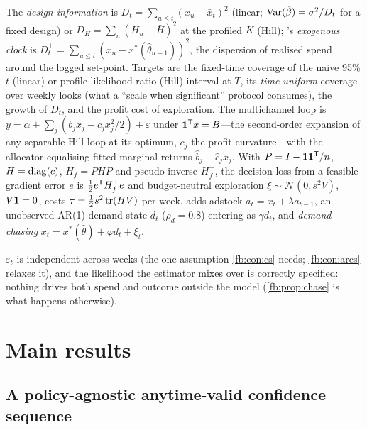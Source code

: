 \begin{definition}
\label{fb:def:clocks}
The \emph{design information} is $D_t = \sum_{u \le t}(x_u - \bar x_t)^2$ (linear; $\operatorname{Var}(\hat\beta) = \sigma^2/D_t$ for a fixed design) or $D_H = \sum_u(H_u - \bar H)^2$ at the profiled $K$ (Hill); 's \emph{exogenous clock} is $D^\perp_t = \sum_{u \le t}(x_u - x^*(\hat\theta_{u-1}))^2$, the dispersion of realised spend around the logged set-point. Targets are the fixed-time coverage of the naive 95\% $t$ (linear) or profile-likelihood-ratio (Hill) interval at $T$, its \emph{time-uniform} coverage over weekly looks (what a ``scale when significant'' protocol consumes), the growth of $D_t$, and the profit cost of exploration. The multichannel loop is $y = \alpha + \sum_j(b_jx_j - c_jx_j^2/2) + \varepsilon$ under $\mathbf{1}^{\mathsf{T}} x = B$---the second-order expansion of any separable Hill loop at its optimum, $c_j$ the profit curvature---with the allocator equalising fitted marginal returns $\hat b_j - \hat c_jx_j$. With $P = I - \mathbf{1}\mathbf{1}^{\mathsf{T}}/n$, $H = \operatorname{diag}(c)$, $H_f = PHP$ and pseudo-inverse $H_f^+$, the decision loss from a feasible-gradient error $e$ is $\tfrac12e^{\mathsf{T}} H_f^+e$ and budget-neutral exploration $\xi \sim \mathcal N(0, s^2V)$, $V\mathbf{1} = 0$, costs $\tau = \tfrac12s^2\operatorname{tr}(HV)$ per week.  adds adstock $a_t = x_t + \lambda a_{t-1}$, an unobserved AR(1) demand state $d_t$ ($\rho_d = 0.8$) entering as $\gamma d_t$, and \emph{demand chasing} $x_t = x^*(\hat\theta) + \varphi d_t + \xi_t$.
\end{definition}

\begin{assumption}
\label{fb:ass:main}
$\varepsilon_t$ is independent across weeks (the one assumption \cref{fb:con:cs} needs; \cref{fb:con:arcs} relaxes it), and the likelihood the estimator mixes over is correctly specified: nothing drives both spend and outcome outside the model (\cref{fb:prop:chase} is what happens otherwise).
\end{assumption}

\section{Main results}

\subsection{A policy-agnostic anytime-valid confidence sequence}

